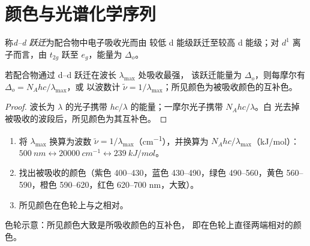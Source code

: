 \section{颜色与光谱化学序列}

\begin{definition}[d--d 跃迁]\label{def:b2:ligand-field:d-d}
称\emph{d--d 跃迁}为配合物中电子吸收光而由
较低 d 能级跃迁至较高 d 能级；对 $d^1$ 离子而言，由
$t_{2g}$ 跃至 $e_g$，能量为 $\Delta_o$。
\end{definition}

\begin{proposition}[由颜色求分裂能]\label{prop:b2:ligand-field:colour}
若配合物通过 d--d 跃迁在波长 $\lambda_{\max}$ 处吸收最强，
该跃迁能量为 $\Delta_o$，则每摩尔有 $\Delta_o = N_Ahc/\lambda_{\max}$，或
以波数计 $\tilde\nu = 1/\lambda_{\max}$；所见颜色为被吸收颜色的互补色。
\end{proposition}

\begin{proof}
波长为 $\lambda$ 的光子携带 $hc/\lambda$ 的能量；一摩尔光子携带 $N_Ahc/\lambda$。白
光去掉被吸收的波段后，所见颜色为其互补色。
\end{proof}

\begin{method}[由吸收带求颜色]\label{met:b2:ligand-field:colour}
\begin{enumerate}
  \item 将 $\lambda_{\max}$ 换算为波数 $\tilde\nu = 1/\lambda_{\max}$（\unit{cm^{-1}}），并换算为
        $N_Ahc/\lambda_{\max}$（\unit{kJ/mol}）：$\qty{500}{nm} \leftrightarrow \qty{20000}{cm^{-1}}
        \leftrightarrow \qty{239}{kJ/mol}$。
  \item 找出被吸收的颜色（紫色 400--430，蓝色 430--490，绿色 490--560，黄色
        560--590，橙色 590--620，红色 620--700 nm，大致）。
  \item 所见颜色在色轮上与之相对。
\end{enumerate}
\end{method}

\begin{omfigure}

{\small 色轮示意：所见颜色大致是所吸收颜色的互补色，
即在色轮上直径两端相对的颜色。}
\end{omfigure}

